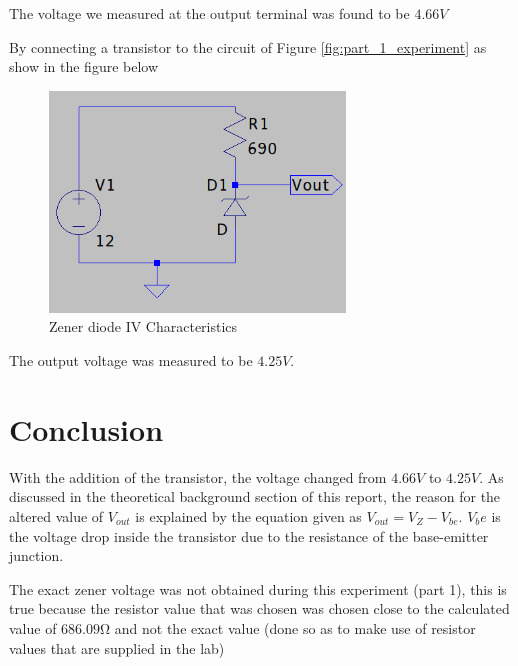 \documentclass[12pt, a4paper]{article}
\begin{document}
		The voltage we measured at the output terminal was found to be $4.66V$

		By connecting a transistor to the circuit of Figure \ref{fig:part_1_experiment} as show in the figure below 

		\begin{figure}[H]
			\centering
			\includegraphics[width=0.7\textwidth]{Images/Part_2_Experiment.png}
			\caption{Zener diode IV Characteristics}
			\label{fig:part_2_experiment}
		\end{figure}

		The output voltage was measured to be $4.25V$. 
	

	\section{Conclusion} %
	\label{sec:conclusion}
		With the addition of the transistor, the voltage changed from $4.66V$ to $4.25V$. As discussed in the theoretical background section of this report, the reason for the altered value of $V_{out}$ is explained by the equation given as $V_{out} = V_Z - V_{be}$. $V_be$ is the voltage drop inside the transistor due to the resistance of the base-emitter junction.

		The exact zener voltage was not obtained during this experiment (part 1), this is true because the resistor value that was chosen was chosen close to the calculated value of $686.09 \si{\ohm}$ and not the exact value (done so as to make use of resistor values that are supplied in the lab)
	
\end{document}
